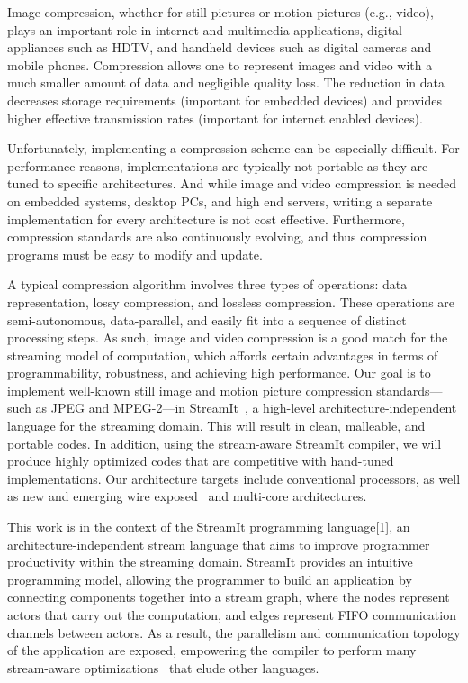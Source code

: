 
Image compression, whether for still pictures or motion pictures
(e.g., video), plays an important role in internet and multimedia
applications, digital appliances such as HDTV, and handheld devices
such as digital cameras and mobile phones. Compression allows one to
represent images and video with a much smaller amount of data and
negligible quality loss. The reduction in data decreases storage
requirements (important for embedded devices) and provides higher
effective transmission rates (important for internet enabled devices).

Unfortunately, implementing a compression scheme can be especially
difficult. For performance reasons, implementations are typically not
portable as they are tuned to specific architectures. And while image
and video compression is needed on embedded systems, desktop PCs, and
high end servers, writing a separate implementation for every
architecture is not cost effective. Furthermore, compression standards
are also continuously evolving, and thus compression programs must be
easy to modify and update.

A typical compression algorithm involves three types of operations:
data representation, lossy compression, and lossless
compression. These operations are semi-autonomous, data-parallel, and
easily fit into a sequence of distinct processing steps. As such,
image and video compression is a good match for the streaming model of
computation, which affords certain advantages in terms of
programmability, robustness, and achieving high performance. Our goal
is to implement well-known still image and motion picture compression
standards---such as JPEG and MPEG-2---in StreamIt~\cite{streamit}, a high-level
architecture-independent language for the streaming domain. This will
result in clean, malleable, and portable codes. In addition, using the
stream-aware StreamIt compiler, we will produce highly optimized codes
that are competitive with hand-tuned implementations. Our architecture
targets include conventional processors, as well as new and emerging
wire exposed~\cite{raw} and multi-core architectures.

This work is in the context of the StreamIt programming language[1],
an architecture-independent stream language that aims to improve
programmer productivity within the streaming domain. StreamIt provides
an intuitive programming model, allowing the programmer to build an
application by connecting components together into a stream graph,
where the nodes represent actors that carry out the computation, and
edges represent FIFO communication channels between actors. As a
result, the parallelism and communication topology of the application
are exposed, empowering the compiler to perform many stream-aware
optimizations~\cite{andrew,sitij,gordo,janis} that elude other languages.

